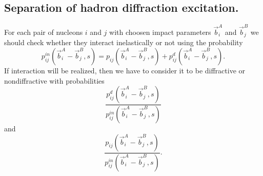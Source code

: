\subsection{Separation of hadron diffraction excitation.}

\hspace{1.0em}For each pair of nucleons $i$ and $j$ with choosen impact
parameters $\vec{b}^{A}_{i}$ and $\vec{b}^{B}_{j}$ we should check
whether they interact inelastically or not using the probability
\begin{equation}
\label{SP14}
p^{in}_{ij}(\vec{b}^{A}_{i}-\vec{b}^{B}_{j},s)=
p_{ij}(\vec{b}^{A}_{i}-\vec{b}^{B}_{j},s)
+ p_{ij}^d(\vec b_i^A-\vec b_j^B,s).
\end{equation}
 If interaction will be realized, then 
we have to consider it to be diffractive or nondiffractive with probabilities
\begin{equation}
\label{SP15}
\frac{p_{ij}^d(\vec b_i^A-\vec b_j^B,s)}{p^{in}_{ij}
(\vec{b}^{A}_{i}-\vec{b}^{B}_{j},s)}
\end{equation}
and
\begin{equation}
\label{SP16}
\frac{p_{ij}(\vec b_i^A-\vec b_j^B,s)}{p^{in}_{ij}
(\vec{b}^{A}_{i}-\vec{b}^{B}_{j},s)}.
\end{equation}
